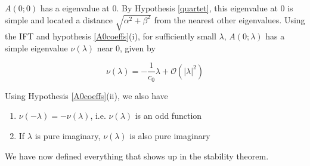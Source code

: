 \documentclass[12pt]{article}
\begin{document}
$A(0; 0)$ has a eigenvalue at 0. By Hypothesis \ref{quartet}, this eigenvalue at 0 is simple and located a distance $\sqrt{\alpha^2 + \beta^2}$ from the nearest other eigenvalues. Using the IFT and hypothesis \ref{A0coeffs}(i), for sufficiently small $\lambda$, $A(0; \lambda)$ has a simple eigenvalue $\nu(\lambda)$ near 0, given by

\begin{equation}\label{nulambda}
\nu(\lambda) = -\frac{1}{c_0} \lambda + \mathcal{O}(|\lambda|^2)
\end{equation}

Using Hypothesis \ref{A0coeffs}(ii), we also have

\begin{enumerate}
\item $\nu(-\lambda) = -\nu(\lambda)$, i.e. $\nu(\lambda)$ is an odd function 
\item If $\lambda$ is pure imaginary, $\nu(\lambda)$ is also pure imaginary
\end{enumerate}

We have now defined everything that shows up in the stability theorem.
\end{document}
